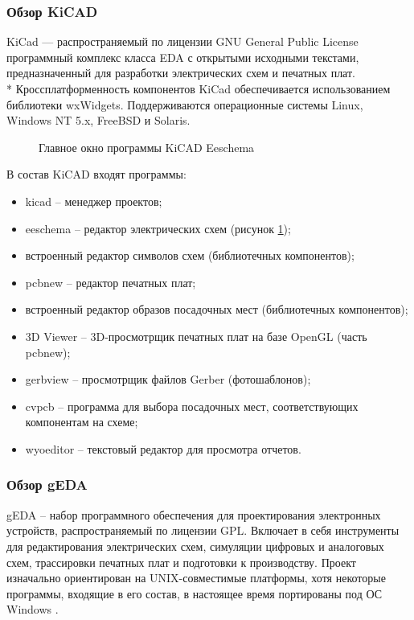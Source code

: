 \subsubsection{Обзор KiCAD}
\begin{par}
KiCad --- распространяемый по лицензии GNU General Public License программный
комплекс класса EDA с открытыми исходными текстами, предназначенный для разработки
электрических схем и печатных плат. \\*
Кроссплатформенность компонентов KiCad обеспечивается использованием библиотеки wxWidgets.
Поддерживаются операционные системы Linux, Windows NT 5.x, FreeBSD и Solaris.
\begin{figure}[ht]
	\caption{Главное окно программы KiCAD Eeschema}
	\label{img:kicad}
\end{figure}
\end{par}

\begin{par}
В состав KiCAD входят программы:
    \begin{itemize}
        \item{}kicad -- менеджер проектов;
        \item{}eeschema -- редактор электрических схем (рисунок \ref{img:kicad});
        \item{}встроенный редактор символов схем (библиотечных компонентов);
        \item{}pcbnew -- редактор печатных плат;
        \item{}встроенный редактор образов посадочных мест (библиотечных компонентов);
        \item{}3D Viewer -- 3D-просмотрщик печатных плат на базе OpenGL (часть pcbnew);
        \item{}gerbview -- просмотрщик файлов Gerber (фотошаблонов);
        \item{}cvpcb -- программа для выбора посадочных мест, соответствующих компонентам на схеме;
        \item{}wyoeditor -- текстовый редактор для просмотра отчетов.
    \end{itemize}
\end{par}


\subsubsection{Обзор gEDA}
\begin{par}
gEDA -- набор программного обеспечения для проектирования электронных устройств,
распространяемый по лицензии GPL. Включает в себя инструменты для редактирования
электрических схем, симуляции цифровых и аналоговых схем, трассировки печатных плат
и подготовки к производству. Проект изначально ориентирован на UNIX-совместимые
платформы, хотя некоторые программы, входящие в его состав, в настоящее время
портированы под ОС Windows \cite{geda}.
\end{par}


